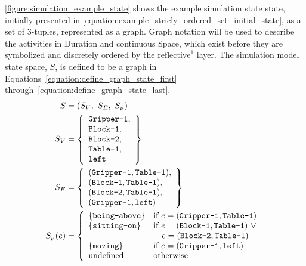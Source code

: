 {\mbox{\autoref{figure:simulation_example_state}}} shows the example
simulation state state, initially presented in
{\mbox{\autoref{equation:example_stricly_ordered_set_initial_state}}},
as a set of 3-tuples, represented as a graph.  Graph notation will be
used to describe the activities in Duration and continuous Space,
which exist before they are symbolized and discretely ordered by the
$\text{reflective}^1$ layer.  The simulation model state space, $S$,
is defined to be a graph in
{\mbox{Equations~\ref{equation:define_graph_state_first}}}
{\mbox{through~\ref{equation:define_graph_state_last}}}.
\begin{align}
\label{equation:define_graph_state_first}
       S &= (S_V, ~S_E, ~S_\mu) \\
     S_V &= {\left\{
               \begin{array}{l}
                 \text{\tt{Gripper-1}}, \\
                 \text{\tt{Block-1}}, \\
                 \text{\tt{Block-2}}, \\
                 \text{\tt{Table-1}}, \\
                 \text{\tt{left}}
               \end{array}
             \right\}} \\
     S_E &= {\left\{
               \begin{array}{l}
                 (\text{\tt{Gripper-1}}, \text{\tt{Table-1}}), \\
                 (\text{\tt{Block-1}}, \text{\tt{Table-1}}), \\
                 (\text{\tt{Block-2}}, \text{\tt{Table-1}}), \\
                 (\text{\tt{Gripper-1}}, \text{\tt{left}})
               \end{array}
             \right\}} \\
\label{equation:define_graph_state_last}
S_\mu(e) &=
  {\left\{
     \begin{array}{ll}
       \{\text{\tt{being-above}}\} & \text{if }e = (\text{\tt{Gripper-1}}, \text{\tt{Table-1}}) \\
       \{\text{\tt{sitting-on}}\}  & \text{if }e = (\text{\tt{Block-1}}, \text{\tt{Table-1}}) ~{\vee}~ \\
                                   & \text{~~ }e = (\text{\tt{Block-2}}, \text{\tt{Table-1}}) \\
       \{\text{\tt{moving}}\}      & \text{if }e = (\text{\tt{Gripper-1}}, \text{\tt{left}}) \\
       \text{undefined} & \text{otherwise}
     \end{array}
   \right.}
\end{align}
